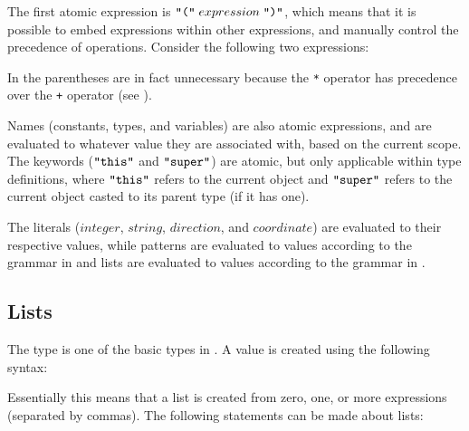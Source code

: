 \begin{ebnf}
\end{ebnf}

The first atomic expression is $\texttt{"("} \; expression \; \texttt{")"}$, which means
that it is possible to embed expressions within other expressions, and manually control
the precedence of operations. Consider the following two expressions:


In  the parentheses are in fact unnecessary because the
\texttt{*} operator has precedence over the \texttt{+} operator (see
).

Names (constants, types, and variables) are also atomic expressions, and are evaluated
to whatever value they are associated with, based on the current scope. The keywords
($\texttt{"this"}$ and $\texttt{"super"}$) are atomic, but only applicable within type
definitions, where $\texttt{"this"}$ refers to the current object and $\texttt{"super"}$
refers to the current object casted to its parent type (if it has one).

The literals ($integer$, $string$, $direction$, and $coordinate$) are evaluated to their
respective values, while patterns are evaluated to  values according to
the grammar in  and lists are evaluated to  values
according to the grammar in .

\subsection{Lists}
\label{sec:lists}

The  type is one of the basic types in \productname{}. A  value is
created using the following syntax:

\begin{ebnf}
\end{ebnf}

Essentially this means that a list is created from zero, one, or more expressions (separated
by commas). The following statements can be made about lists:

